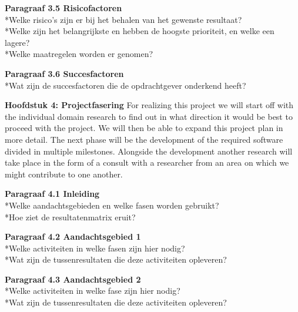 \documentclass{article}
\begin{document}
\noindent
\textbf{Paragraaf 3.5 Risicofactoren}
\\*Welke risico's zijn er bij het behalen van het gewenste resultaat?
\\*Welke zijn het belangrijkste en hebben de hoogste prioriteit, en welke een lagere?
\\*Welke maatregelen worden er genomen?
\newline

\noindent
\textbf{Paragraaf 3.6 Succesfactoren}
\\*Wat zijn de succesfactoren die de opdrachtgever onderkend heeft?
\newline
\newline

\textbf{Hoofdstuk 4: Projectfasering}
For realizing this project we will start off with the individual domain research to find out in what direction it would be best to proceed with the project. We will then be able to expand this project plan in more detail. The next phase will be the development of the required software divided in multiple milestones. Alongside the development another research will take place in the form of a consult with a researcher from an area on which we might contribute to one another.
\newline

\noindent
\textbf{Paragraaf 4.1 Inleiding}
\\*Welke aandachtsgebieden en welke fasen worden gebruikt?
\\*Hoe ziet de resultatenmatrix eruit?
\newline

\noindent
\textbf{Paragraaf 4.2 Aandachtsgebied 1}
\\*Welke activiteiten in welke fasen zijn hier nodig?
\\*Wat zijn de tussenresultaten die deze activiteiten opleveren?
\newline

\noindent
\textbf{Paragraaf 4.3 Aandachtsgebied 2}
\\*Welke activiteiten in welke fase zijn hier nodig?
\\*Wat zijn de tussenresultaten die deze activiteiten opleveren?
\newline
\end{document}
